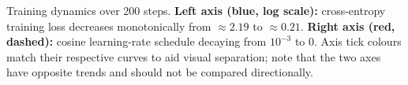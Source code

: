 \caption{Training dynamics over 200 steps. \textbf{Left axis (blue, log scale):} cross-entropy training loss decreases monotonically from ${\approx}2.19$ to ${\approx}0.21$. \textbf{Right axis (red, dashed):} cosine learning-rate schedule decaying from $10^{-3}$ to $0$. Axis tick colours match their respective curves to aid visual separation; note that the two axes have opposite trends and should not be compared directionally.}
